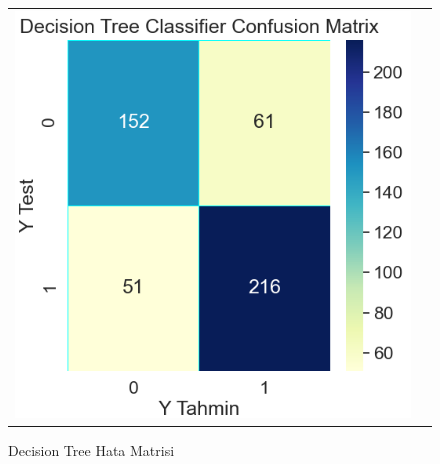 \documentclass[conference]{IEEEtran}
\begin{document}
\begin{figure}[!h]
	\centering
	\begin{center}
		\begin{tabular}{cc}
			\includegraphics[scale=0.4]{pictures/pic_13.png}&
		\end{tabular}
	\end{center}
	\caption{Decision Tree Hata Matrisi}
	\label{fig:13}
\end{figure}
\end{document}
